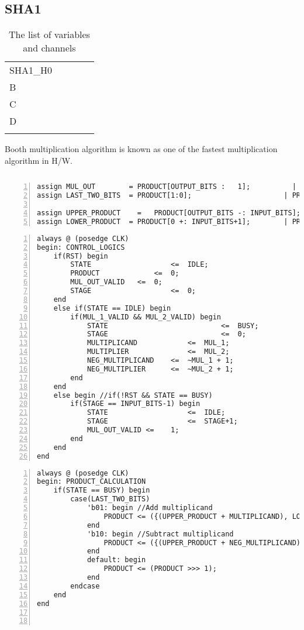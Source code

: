 \subsection{SHA1}

\begin{table}[]
	\centering
	\caption{The list of variables and channels}
	\label{my-label}
	\begin{tabular}{lllll}
		SHA1\_H0 &  &  &  &  \\
		B &  &  &  &  \\
		C &  &  &  &  \\
		D &  &  &  &  \\
		  &  &  &  & 
	\end{tabular}
\end{table}

Booth multiplication algorithm is known as one of the fastest multiplication algorithm in H/W.

\begin{Verbatim}[frame=single, numbers=left, tabsize=4, label=Command input/output]

\end{Verbatim}
\begin{Verbatim}[frame=single, numbers=left, tabsize=2, label=Combinational logic]
assign MUL_OUT        = PRODUCT[OUTPUT_BITS	:	1];          | PRODUCT => MUL_OUT
assign LAST_TWO_BITS  =	PRODUCT[1:0];                      | PRODUCT => LAST_TWO_BITS

assign UPPER_PRODUCT	=	PRODUCT[OUTPUT_BITS -: INPUT_BITS];| PRODUCT => UPPER_PRODUCT
assign LOWER_PRODUCT  =	PRODUCT[0 +: INPUT_BITS+1];        | PRODUCT => LOWER_PRODUCT
\end{Verbatim}

\begin{Verbatim}[frame=single, numbers=left, tabsize=4, label=Control logic]
always @ (posedge CLK)
begin: CONTROL_LOGICS
	if(RST) begin
		STATE					<=	IDLE;
		PRODUCT				<=	0;
		MUL_OUT_VALID	<=	0;
		STAGE					<=	0;
	end
	else if(STATE == IDLE) begin
		if(MUL_1_VALID && MUL_2_VALID) begin
			STATE							<=	BUSY;
			STAGE							<=	0;
			MULTIPLICAND			<=	MUL_1;
			MULTIPLIER				<=	MUL_2;
			NEG_MULTIPLICAND	<=	~MUL_1 + 1;
			NEG_MULTIPLIER		<=	~MUL_2 + 1;
		end
	end
	else begin //if(!RST && STATE == BUSY)
		if(STAGE == INPUT_BITS-1) begin
			STATE					<=	IDLE;
			STAGE					<=	STAGE+1;	
			MUL_OUT_VALID <=	1;
		end
	end
end
\end{Verbatim}



\begin{Verbatim}[frame=single, numbers=left, tabsize=4, label=Product calculation]
always @ (posedge CLK)
begin: PRODUCT_CALCULATION
	if(STATE == BUSY) begin
		case(LAST_TWO_BITS)
			'b01: begin //Add multiplicand
				PRODUCT <= ({(UPPER_PRODUCT + MULTIPLICAND), LOWER_PRODUCT} >>> 1); 
			end
			'b10: begin	//Subtract multiplicand
				PRODUCT <= ({(UPPER_PRODUCT + NEG_MULTIPLICAND), LOWER_PRODUCT} >>> 1); 
			end
			default: begin
				PRODUCT	<= (PRODUCT >>> 1);
			end
		endcase
	end
end



\end{Verbatim}
